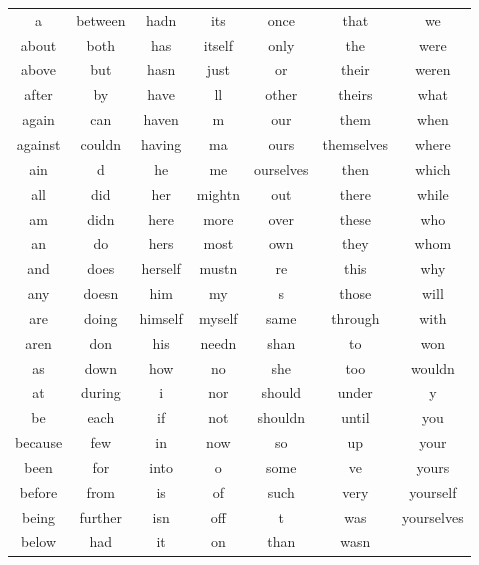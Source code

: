\begin{appendices}
		\label{appn:stop_words}%
		\begin{table}[htbp]
			\centering
			\begin{tabular}{|c|c|c|c|c|c|c|}
				\hline\hline
				a	&	between	&	hadn	&	its	&	once	&	that	&	we	\\
				about	&	both	&	has	&	itself	&	only	&	the	&	were	\\
				above	&	but	&	hasn	&	just	&	or	&	their	&	weren	\\
				after	&	by	&	have	&	ll	&	other	&	theirs	&	what	\\
				again	&	can	&	haven	&	m	&	our	&	them	&	when	\\
				against	&	couldn	&	having	&	ma	&	ours	&	themselves	&	where	\\
				ain	&	d	&	he	&	me	&	ourselves	&	then	&	which	\\
				all	&	did	&	her	&	mightn	&	out	&	there	&	while	\\
				am	&	didn	&	here	&	more	&	over	&	these	&	who	\\
				an	&	do	&	hers	&	most	&	own	&	they	&	whom	\\
				and	&	does	&	herself	&	mustn	&	re	&	this	&	why	\\
				any	&	doesn	&	him	&	my	&	s	&	those	&	will	\\
				are	&	doing	&	himself	&	myself	&	same	&	through	&	with	\\
				aren	&	don	&	his	&	needn	&	shan	&	to	&	won	\\
				as	&	down	&	how	&	no	&	she	&	too	&	wouldn	\\
				at	&	during	&	i	&	nor	&	should	&	under	&	y	\\
				be	&	each	&	if	&	not	&	shouldn	&	until	&	you	\\
				because	&	few	&	in	&	now	&	so	&	up	&	your	\\
				been	&	for	&	into	&	o	&	some	&	ve	&	yours	\\
				before	&	from	&	is	&	of	&	such	&	very	&	yourself	\\
				being	&	further	&	isn	&	off	&	t	&	was	&	yourselves	\\
				below	&	had	&	it	&	on	&	than	&	wasn	&		\\
				\hline\hline
			\end{tabular}%
		\end{table}%
	

\end{appendices}
